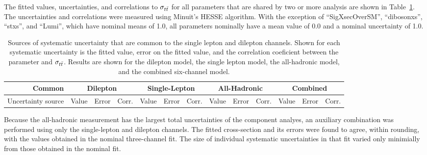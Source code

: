 The fitted values, uncertainties, and correlations to $\sigma_{ t\bar{t} }$ for all parameters that are shared by two or more analysis are shown in Table~\ref{tab:commonFittedParams}.
The uncertainties and correlations were measured using Minuit's HESSE algorithm.
With the exception of ``SigXsecOverSM'', ``dibosonxs'', ``stxs'', and ``Lumi'', which have nominal means of 1.0, all parameters nominally have a mean value of 0.0 and a nominal uncertainty of 1.0.


\begin{table}[htbp]

  \begin{center}  
    \tiny
    \begin{tabular}{|r|ccc|ccc|ccc|ccc|} 
      \hline
      Common & \multicolumn{3}{|c|}{Dilepton}  & \multicolumn{3}{|c|}{Single-Lepton} & \multicolumn{3}{|c|}{All-Hadronic} & \multicolumn{3}{|c|}{Combined} \\
      \hline
      Uncertainty source & Value & Error & Corr. & Value & Error & Corr. & Value & Error & Corr. & Value & Error & Corr. \\
      \hline
      
      \hline
    \end{tabular}
  \end{center}
  \caption{ \label{tab:commonFittedParams} Sources of systematic uncertainty that are common to the single lepton and dilepton channels.  Shown for each systematic uncertainty is the fitted value, error on the fitted value, and the correlation coeficient between the parameter and $\sigma_{t\bar{t}}$.  Results are shown for the dilepton model, the single lepton model, the all-hadronic model, and the combined six-channel model. }
\end{table}

Because the all-hadronic measurement has the largest total uncertainties of the component analyes, an auxiliary combination was performed using only the single-lepton and dilepton channels.
The fitted cross-section and its errors were found to agree, within rounding, with the values obtained in the nominal three-channel fit.
The size of individual systematic uncertainties in that fit varied only minimially from those obtained in the nominal fit.

